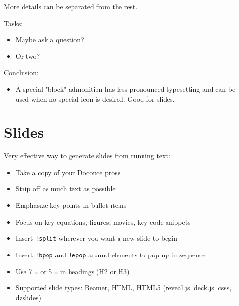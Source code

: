 \documentclass[%
twoside,                 %
final,                   %
chapterprefix=true,      %
open=right               %
10pt]{book}
\newenvironment{graybox1admon}[1][]{
\begin{graybox1mdframed}[frametitle=#1]
}
{
\end{graybox1mdframed}
}
\begin{document}
\begin{graybox1admon}[Going deeper.]
More details can be separated from the rest.
\end{graybox1admon}




\begin{graybox1admon}[Time for review!]
Tasks:

\begin{itemize}
  \item Maybe ask a question?

  \item Or two?
\end{itemize}

\noindent
\end{graybox1admon}




\begin{graybox1admon}[]
Conclusion:

\begin{itemize}
  \item A special "block" admonition has less pronounced typesetting and
    can be used when no special icon is desired. Good for slides.
\end{itemize}

\noindent
\end{graybox1admon}



\section*{Slides}

Very effective way to generate slides from running text:

\begin{itemize}
 \item Take a copy of your Doconce prose

 \item Strip off as much text as possible

 \item Emphasize key points in bullet items

 \item Focus on key equations, figures, movies, key code snippets

 \item Insert \Verb~!split~ wherever you want a new slide to begin

 \item Insert \Verb~!bpop~ and \Verb~!epop~ around elements to pop up
   in sequence

 \item Use 7 \Verb!=! or 5 \Verb!=! in headings (H2 or H3)

 \item Supported slide types: Beamer, HTML,
   HTML5 (reveal.js, deck.js, csss, dzslides)
\end{itemize}
\end{document}
